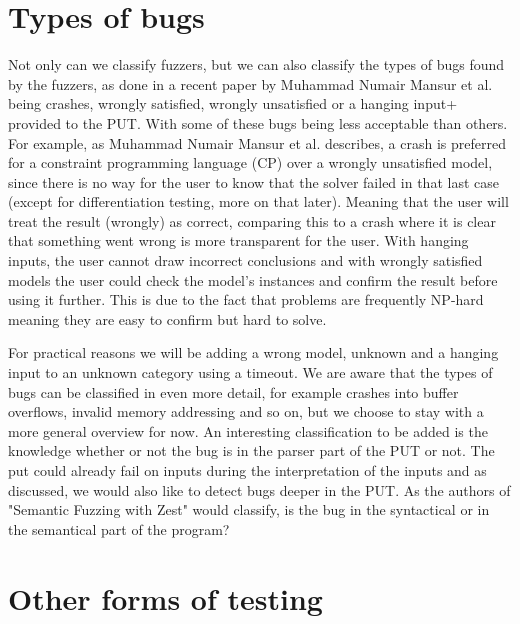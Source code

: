 \section{Types of bugs}
\label{cha:2:TypesOfBugs}
Not only can we classify fuzzers, but we can also classify the types of bugs found by the fuzzers, as done in a recent paper \cite{1mansur2020detecting} by Muhammad Numair Mansur et al. being crashes, wrongly satisfied, wrongly unsatisfied or a hanging input+ provided to the PUT. With some of these bugs being less acceptable than others. For example, as Muhammad Numair Mansur et al. describes, a crash is preferred for a constraint programming language (CP) over a wrongly unsatisfied model, since there is no way for the user to know that the solver failed in that last case (except for differentiation testing, more on that later). Meaning that the user will treat the result (wrongly) as correct, comparing this to a crash where it is clear that something went wrong is more transparent for the user. With hanging inputs, the user cannot draw incorrect conclusions and with wrongly satisfied models the user could check the model's instances and confirm the result before using it further. This is due to the fact that problems are frequently NP-hard meaning they are easy to confirm but hard to solve. 

For practical reasons we will be adding a wrong model, unknown and a hanging input to an unknown category using a timeout. We are aware that the types of bugs can be classified in even more detail, for example crashes into buffer overflows, invalid memory addressing and so on, but we choose to stay with a more general overview for now. An interesting classification to be added is the knowledge whether or not the bug is in the parser part of the PUT or not. The put could already fail on inputs during the interpretation of the inputs and as discussed, we would also like to detect bugs deeper in the PUT. As the authors of "Semantic Fuzzing with Zest" \cite{22SemanticFuzzing} would classify, is the bug in the syntactical or in the semantical part of the program?

\section{Other forms of testing}
